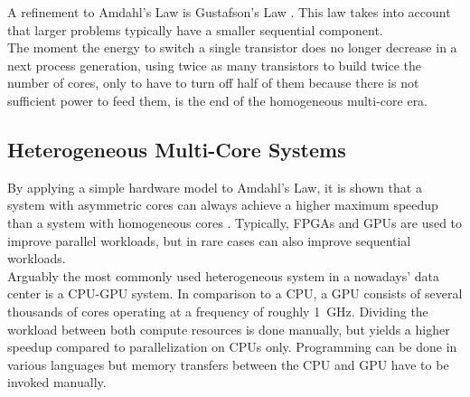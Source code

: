 
A refinement to Amdahl's Law is Gustafson's Law \cite{gustafson}. This law takes into account that larger problems typically have a smaller sequential component.\\
The moment the energy to switch a single transistor does no longer decrease in a next process generation, using twice as many transistors to build twice the number of cores, only to have to turn off half of them because there is not sufficient power to feed them, is the end of the homogeneous multi-core era.





\subsection{Heterogeneous Multi-Core Systems}
\label{sec:hetero}
By applying a simple hardware model to Amdahl's Law, it is shown that a system with asymmetric cores can always achieve a higher maximum speedup than a system with homogeneous cores \cite{amdahl-era}.
Typically, FPGAs and GPUs are used to improve parallel workloads, but in rare cases can also improve sequential workloads.\\


Arguably the most commonly used heterogeneous system in a nowadays' data center is a CPU-GPU system. In comparison to a CPU, a GPU consists of several thousands of cores operating at a frequency of roughly \SI{1}{\giga\hertz}. Dividing the workload between both compute resources is done manually, but yields a higher speedup compared to parallelization on CPUs only. Programming can be done in various languages but memory transfers between the CPU and GPU have to be invoked manually.\\

